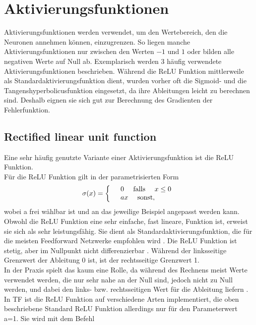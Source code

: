 \newpage
\section{Aktivierungsfunktionen}
Aktivierungsfunktionen werden verwendet, um den Wertebereich, den die Neuronen annehmen k\"onnen, einzugrenzen. So liegen manche Aktivierungsfunktionen nur zwischen den Werten $-1$ und $1$ oder bilden alle negativen Werte auf Null ab. Exemplarisch werden 3 häufig verwendete Aktivierungsfunktionen beschrieben.
Während die \gls{ReLU} Funktion mittlerweile als Standardaktivierungsfunktion dient, wurden vorher oft die Sigmoid- und die Tangenshyperbolicusfunktion eingesetzt, da ihre Ableitungen leicht zu berechnen sind. Deshalb eignen sie sich gut zur Berechnung des Gradienten der Fehlerfunktion.


\subsection{Rectified linear unit function} \label{sub:relu}
Eine sehr häufig genutzte Variante einer Aktivierungsfunktion ist die \gls{ReLU} Funktion.\\
F\"ur die \gls{ReLU} Funktion gilt in der parametrisierten Form \cite{Goodfellow}
\begin{align*}
\sigma(x)=
\left\{
\begin{array}{l l}
& 0 \quad \text{   falls  } \quad x \leq 0  \\ 
& ax \quad \text{   sonst},
\end{array}
\right.
\end{align*}
wobei a frei w\"ahlbar ist und an das jeweilige Beispiel angepasst werden kann. Obwohl die \gls{ReLU} Funktion eine sehr einfache, fast lineare, Funktion ist, erweist sie sich als sehr leistungsf\"ahig. Sie dient als Standardaktivierungsfunktion, die f\"ur die meisten Feedforward Netzwerke empfohlen wird \cite{Goodfellow}. 
Die \gls{ReLU} Funktion ist stetig, aber im Nullpunkt nicht differenzierbar \cite{cookbook}. Während der linksseitige Grenzwert der Ableitung 0 ist, ist der rechtsseitige Grenzwert 1.\\
In der Praxis spielt das kaum eine Rolle, da während des Rechnens meist Werte verwendet werden, die nur sehr nahe an der Null sind, jedoch nicht zu Null werden, und dabei den links- bzw. rechtsseitigen Wert für die Ableitung liefern \cite{Goodfellow}. In \gls{TF} ist die \gls{ReLU} Funktion auf verschiedene Arten implementiert, die oben beschriebene Standard \gls{ReLU} Funktion allerdings nur f\"ur den Parameterwert a=1. Sie wird mit dem Befehl \cite{cookbook}


